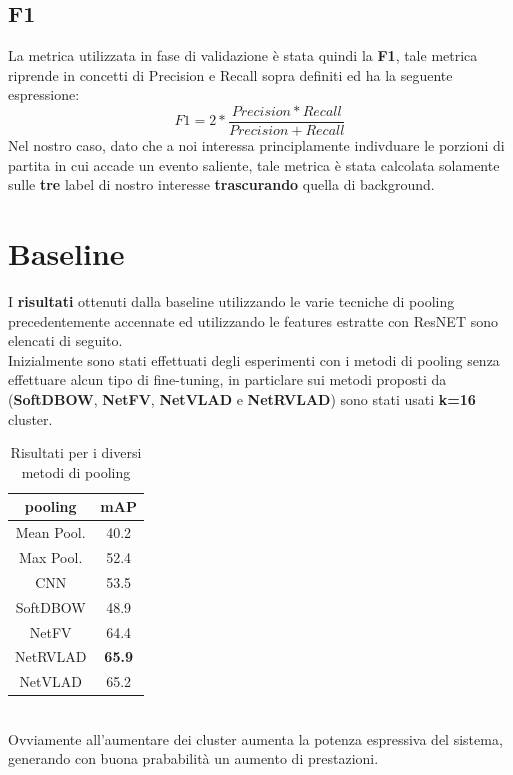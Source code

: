 \subsection{F1}
La metrica utilizzata in fase di validazione è stata quindi la \textbf{F1}, tale metrica riprende in concetti di Precision e Recall sopra definiti ed ha la seguente espressione:
\begin{equation}
F1=2*\frac{Precision * Recall}{Precision + Recall}
\label{F1}
\end{equation}
Nel nostro caso, dato che a noi interessa principlamente indivduare le porzioni di partita in cui accade un evento saliente, tale metrica è stata calcolata solamente sulle \textbf{tre} label di nostro interesse \textbf{trascurando} quella di background.
\section{Baseline \cite{soccerNet}}
I \textbf{risultati} ottenuti dalla baseline utilizzando le varie tecniche di pooling precedentemente accennate ed utilizzando le features estratte con ResNET sono elencati di seguito.
\\Inizialmente sono stati effettuati degli esperimenti con i metodi di pooling senza effettuare alcun tipo di fine-tuning, in particlare sui metodi proposti da \citet{MiechPooling} (\textbf{SoftDBOW}, \textbf{NetFV}, \textbf{NetVLAD} e \textbf{NetRVLAD}) sono stati usati \textbf{k=16} cluster.
\begin{table}[ht]
\caption{Risultati per i diversi metodi di pooling}
\centering
\begin{tabular}{c| | c}
pooling & mAP \\
\hline
Mean Pool. & 40.2 \\
Max Pool. &  52.4\\
CNN & 53.5\\
SoftDBOW & 48.9\\
NetFV & 64.4\\
NetRVLAD & \textbf{65.9}\\
NetVLAD & 65.2\\ [1ex]

\end{tabular}
\label{table: baselinek16}
\end{table}
\\Ovviamente all'aumentare dei cluster aumenta la potenza espressiva del sistema, generando con buona prababilità un aumento di prestazioni.

